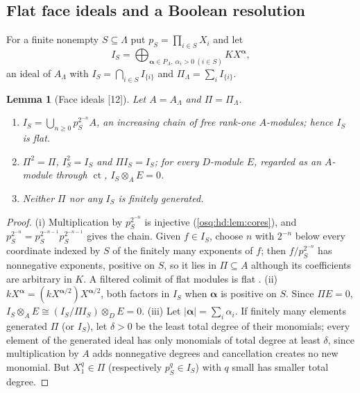 \documentclass[11pt,letterpaper]{article}
\numberwithin{equation}{section}
\newtheorem{lemma}[lemma]{Lemma}
\theoremstyle{definition}
\theoremstyle{remark}
\theoremstyle{plain}
\newcommand{\ct}{\operatorname{ct}}
\newcommand{\src}[1]{\textup{\textsf{[#1]}}}
\begin{document}
\subsection{Flat face ideals and a Boolean resolution}\label{osq:hd:sub:resolution}

For a finite nonempty $S\subseteq\Lambda$ put $p_S=\prod_{i\in S}X_i$ and let
\begin{equation}\label{osq:hd:eq:IS}
 I_S=\bigoplus_{\boldsymbol\alpha\in P_\Lambda,\ \alpha_i>0\ (i\in S)}KX^{\boldsymbol\alpha},
\end{equation}
an ideal of $A_\Lambda$ with $I_S=\bigcap_{i\in S}I_{\{i\}}$ and $\Pi_\Lambda=\sum_iI_{\{i\}}$.

\begin{lemma}[Face ideals \src{12}]\label{osq:hd:lem:faces}
Let $A=A_\Lambda$ and $\Pi=\Pi_\Lambda$.
\begin{enumerate}
\item $I_S=\bigcup_{n\ge0}p_S^{2^{-n}}A$, an increasing chain of free rank-one $A$-modules; hence $I_S$ is flat.
\item $\Pi^2=\Pi$, $I_S^2=I_S$ and $\Pi I_S=I_S$; for every $D$-module $E$, regarded as an $A$-module through $\ct$,
$I_S\otimes_AE=0$.
\item Neither $\Pi$ nor any $I_S$ is finitely generated.
\end{enumerate}
\end{lemma}
\begin{proof}
(i) Multiplication by $p_S^{2^{-n}}$ is injective (\cref{osq:hd:lem:cores}), and
$p_S^{2^{-n}}=p_S^{2^{-n-1}}p_S^{2^{-n-1}}$ gives the chain. Given $f\in I_S$, choose $n$ with $2^{-n}$ below every
coordinate indexed by $S$ of the finitely many exponents of $f$; then $f/p_S^{2^{-n}}$ has nonnegative exponents,
positive on $S$, so it lies in $\Pi\subseteq A$ although its coefficients are arbitrary in $K$. A filtered colimit of
flat modules is flat \cite[Lemma~10.39.3]{StacksFlat}.
(ii) $kX^{\boldsymbol\alpha}=(kX^{\boldsymbol\alpha/2})X^{\boldsymbol\alpha/2}$, both factors in $I_S$ when
$\boldsymbol\alpha$ is positive on $S$. Since $\Pi E=0$, $I_S\otimes_AE\cong(I_S/\Pi I_S)\otimes_DE=0$.
(iii) Let $|\boldsymbol\alpha|=\sum_i\alpha_i$. If finitely many elements generated $\Pi$ (or $I_S$), let $\delta>0$ be
the least total degree of their monomials; every element of the generated ideal has only monomials of total degree
at least $\delta$, since multiplication by $A$ adds nonnegative degrees and cancellation creates no new monomial. But
$X_1^q\in\Pi$ (respectively $p_S^q\in I_S$) with $q$ small has smaller total degree.
\end{proof}
\end{document}
